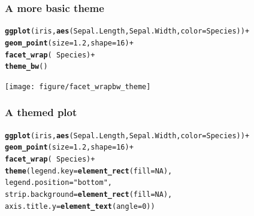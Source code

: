 \documentclass{beamer}\usepackage[]{graphicx}\usepackage[]{color}
\makeatletter
\newcommand{\hlnum}[1]{\textcolor[rgb]{0.686,0.059,0.569}{#1}}%
\newcommand{\hlstr}[1]{\textcolor[rgb]{0.192,0.494,0.8}{#1}}%
\newcommand{\hlopt}[1]{\textcolor[rgb]{0,0,0}{#1}}%
\newcommand{\hlstd}[1]{\textcolor[rgb]{0.345,0.345,0.345}{#1}}%
\newcommand{\hlkwc}[1]{\textcolor[rgb]{0.333,0.667,0.333}{#1}}%
\newcommand{\hlkwd}[1]{\textcolor[rgb]{0.737,0.353,0.396}{\textbf{#1}}}%
\newenvironment{kframe}{%
 \def\at@end@of@kframe{}%
 \ifinner\ifhmode%
  \def\at@end@of@kframe{\end{minipage}}%
  \begin{minipage}{\columnwidth}%
 \fi\fi%
 \def\FrameCommand##1{\hskip\@totalleftmargin \hskip-\fboxsep
 \colorbox{shadecolor}{##1}\hskip-\fboxsep
     \hskip-\linewidth \hskip-\@totalleftmargin \hskip\columnwidth}%
 \MakeFramed {\advance\hsize-\width
   \@totalleftmargin\z@ \linewidth\hsize
   \@setminipage}}%
 {\par\unskip\endMakeFramed%
 \at@end@of@kframe}
\newenvironment{knitrout}{}{} %
\makeatother
\begin{document}
\begin{frame}[fragile]
\frametitle{A more basic theme}
\begin{knitrout}\footnotesize
{}\color{fgcolor}\begin{kframe}
\begin{alltt}
\hlkwd{ggplot}\hlstd{(iris,} \hlkwd{aes}\hlstd{(Sepal.Length, Sepal.Width,} \hlkwc{color} \hlstd{= Species))} \hlopt{+}
    \hlkwd{geom_point}\hlstd{(}\hlkwc{size} \hlstd{=} \hlnum{1.2}\hlstd{,} \hlkwc{shape} \hlstd{=} \hlnum{16}\hlstd{)} \hlopt{+}
    \hlkwd{facet_wrap}\hlstd{(} \hlopt{~} \hlstd{Species)} \hlopt{+}
    \hlkwd{theme_bw}\hlstd{()}
\end{alltt}
\end{kframe}

{\centering \texttt{[image: figure/facet\_wrapbw\_theme]} 

}



\end{knitrout}
\end{frame}


\begin{frame}[fragile]
\frametitle{A themed plot}
\begin{knitrout}\footnotesize
{}\color{fgcolor}\begin{kframe}
\begin{alltt}
\hlkwd{ggplot}\hlstd{(iris,} \hlkwd{aes}\hlstd{(Sepal.Length, Sepal.Width,} \hlkwc{color} \hlstd{= Species))} \hlopt{+}
    \hlkwd{geom_point}\hlstd{(}\hlkwc{size} \hlstd{=} \hlnum{1.2}\hlstd{,} \hlkwc{shape} \hlstd{=} \hlnum{16}\hlstd{)} \hlopt{+}
    \hlkwd{facet_wrap}\hlstd{(} \hlopt{~} \hlstd{Species)} \hlopt{+}
    \hlkwd{theme}\hlstd{(}\hlkwc{legend.key} \hlstd{=} \hlkwd{element_rect}\hlstd{(}\hlkwc{fill} \hlstd{=} \hlnum{NA}\hlstd{),}
        \hlkwc{legend.position} \hlstd{=} \hlstr{"bottom"}\hlstd{,}
        \hlkwc{strip.background} \hlstd{=} \hlkwd{element_rect}\hlstd{(}\hlkwc{fill} \hlstd{=} \hlnum{NA}\hlstd{),}
        \hlkwc{axis.title.y} \hlstd{=} \hlkwd{element_text}\hlstd{(}\hlkwc{angle} \hlstd{=} \hlnum{0}\hlstd{))}
\end{alltt}
\end{kframe}
\end{knitrout}
\end{frame}
\end{document}
